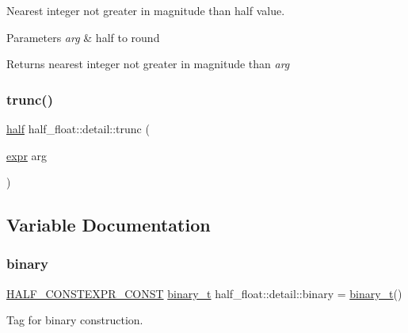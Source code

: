Nearest integer not greater in magnitude than half value. 
\begin{DoxyParams}{Parameters}
{\em arg} & half to round \\
\hline
\end{DoxyParams}
\begin{DoxyReturn}{Returns}
nearest integer not greater in magnitude than {\itshape arg} 
\end{DoxyReturn}
\mbox{\label{namespacehalf__float_1_1detail_a200c486961a2c2aea24ed7c323acad97}} 
\subsubsection{\texorpdfstring{trunc()}{trunc()}\hspace{0.1cm}{\footnotesize\ttfamily [2/2]}}
{\footnotesize\ttfamily \hyperlink{classhalf__float_1_1half}{half} half\+\_\+float\+::detail\+::trunc (\begin{DoxyParamCaption}\item[{\hyperlink{structhalf__float_1_1detail_1_1expr}{expr}}]{arg }\end{DoxyParamCaption})\hspace{0.3cm}{\ttfamily [inline]}}



\subsection{Variable Documentation}
\mbox{\label{namespacehalf__float_1_1detail_a083e9a0ced4c4a5495ac89dd753dd215}} 
\subsubsection{\texorpdfstring{binary}{binary}}
{\footnotesize\ttfamily \hyperlink{half_8hpp_a5df92c245e5d4e45d35fad7b6de73354}{H\+A\+L\+F\+\_\+\+C\+O\+N\+S\+T\+E\+X\+P\+R\+\_\+\+C\+O\+N\+ST} \hyperlink{structhalf__float_1_1detail_1_1binary__t}{binary\+\_\+t} half\+\_\+float\+::detail\+::binary = \hyperlink{structhalf__float_1_1detail_1_1binary__t}{binary\+\_\+t}()}



Tag for binary construction. 

